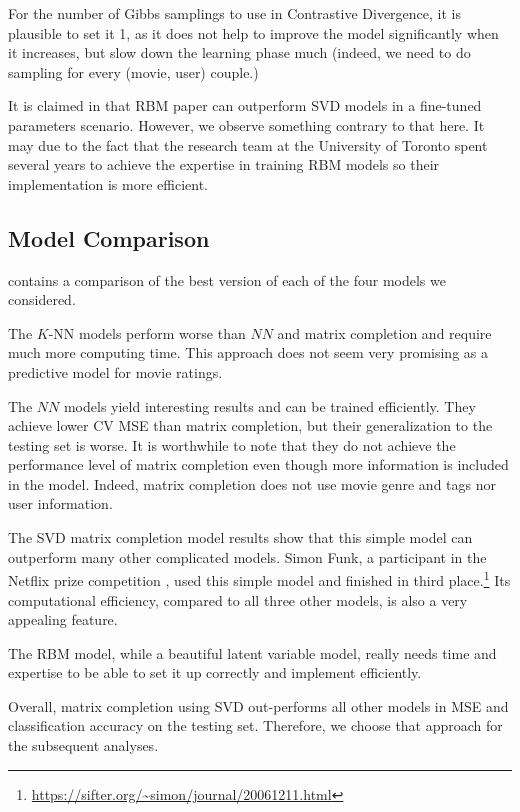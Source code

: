 \documentclass[bj, preprint]{imsart}
\begin{document}
For the number of Gibbs samplings to use in Contrastive Divergence, it is plausible to set it 1, as it does not help to improve the model significantly when it increases, but slow down the learning phase much (indeed, we need to do sampling for every (movie, user) couple.)

It is claimed in \cite{10.1145/1273496.1273596} that RBM paper can outperform SVD models in a fine-tuned parameters scenario. However, we observe something contrary to that here. It may due to the fact that the research team at the University of Toronto spent several years to achieve the expertise in training RBM models so their implementation is more efficient. 

\subsection{Model Comparison}\label{sebsec:results.model}

 contains a comparison of the best version of each of the four models we considered. 

The $K$-NN models perform worse than $NN$ and matrix completion and require much more computing time. This approach does not seem very promising as a predictive model for movie ratings.

The $NN$ models yield interesting results and can be trained efficiently. They achieve lower CV MSE than matrix completion, but their generalization to the testing set is worse. It is worthwhile to note that they do not achieve the performance level of matrix completion even though more information is included in the model. Indeed, matrix completion does not use movie genre and tags nor user information.

The SVD matrix completion model results show that this simple model can outperform many other complicated models. Simon Funk, a participant in the Netflix prize competition \citep{bennett2007netflix}, used this simple model and finished in third place.\footnote{\url{https://sifter.org/~simon/journal/20061211.html}} Its computational efficiency, compared to all three other models, is also a very appealing feature.

The RBM model, while a beautiful latent variable model, really needs time and expertise to be able to set it up correctly and implement efficiently.  

Overall, matrix completion using SVD out-performs all other models in MSE and classification accuracy on the testing set. Therefore, we choose that approach for the subsequent analyses.
\end{document}
